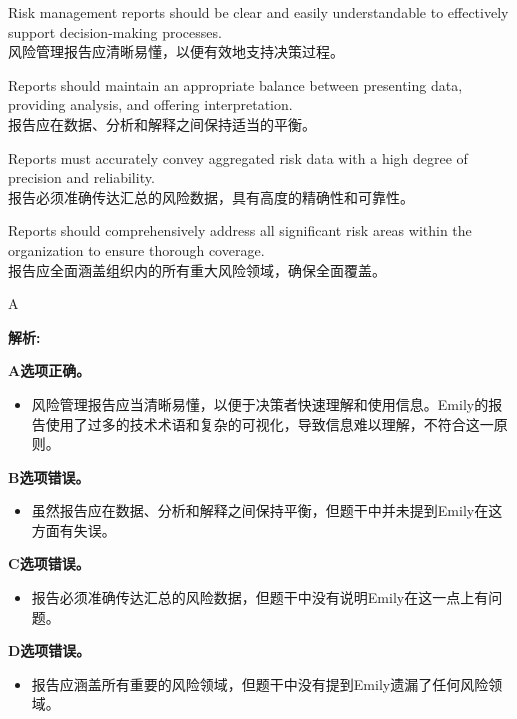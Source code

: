 \documentclass{article}
\newenvironment{explanation}
{\textbf{解析:}\par}
{\par}
\begin{document}
\begin{choices}
    \item Risk management reports should be clear and easily understandable to effectively support decision-making processes. \\
    风险管理报告应清晰易懂，以便有效地支持决策过程。
    \item Reports should maintain an appropriate balance between presenting data, providing analysis, and offering interpretation. \\
    报告应在数据、分析和解释之间保持适当的平衡。
    \item Reports must accurately convey aggregated risk data with a high degree of precision and reliability. \\
    报告必须准确传达汇总的风险数据，具有高度的精确性和可靠性。
    \item Reports should comprehensively address all significant risk areas within the organization to ensure thorough coverage. \\
    报告应全面涵盖组织内的所有重大风险领域，确保全面覆盖。
\end{choices}

\begin{correctanswer}
A
\end{correctanswer}

\begin{explanation}
    \textbf{A选项正确。}
    \begin{itemize}
        \item 风险管理报告应当清晰易懂，以便于决策者快速理解和使用信息。Emily的报告使用了过多的技术术语和复杂的可视化，导致信息难以理解，不符合这一原则。
    \end{itemize}

    \textbf{B选项错误。}
    \begin{itemize}
        \item 虽然报告应在数据、分析和解释之间保持平衡，但题干中并未提到Emily在这方面有失误。
    \end{itemize}

    \textbf{C选项错误。}
    \begin{itemize}
        \item 报告必须准确传达汇总的风险数据，但题干中没有说明Emily在这一点上有问题。
    \end{itemize}

    \textbf{D选项错误。}
    \begin{itemize}
        \item 报告应涵盖所有重要的风险领域，但题干中没有提到Emily遗漏了任何风险领域。
    \end{itemize}
\end{explanation}
\end{document}
